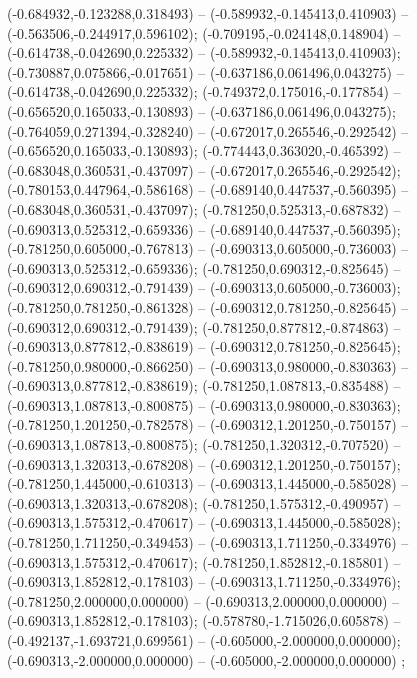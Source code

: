 (-0.684932,-0.123288,0.318493) -- (-0.589932,-0.145413,0.410903) -- (-0.563506,-0.244917,0.596102);
 (-0.709195,-0.024148,0.148904) -- (-0.614738,-0.042690,0.225332) -- (-0.589932,-0.145413,0.410903);
 (-0.730887,0.075866,-0.017651) -- (-0.637186,0.061496,0.043275) -- (-0.614738,-0.042690,0.225332);
 (-0.749372,0.175016,-0.177854) -- (-0.656520,0.165033,-0.130893) -- (-0.637186,0.061496,0.043275);
 (-0.764059,0.271394,-0.328240) -- (-0.672017,0.265546,-0.292542) -- (-0.656520,0.165033,-0.130893);
 (-0.774443,0.363020,-0.465392) -- (-0.683048,0.360531,-0.437097) -- (-0.672017,0.265546,-0.292542);
 (-0.780153,0.447964,-0.586168) -- (-0.689140,0.447537,-0.560395) -- (-0.683048,0.360531,-0.437097);
 (-0.781250,0.525313,-0.687832) -- (-0.690313,0.525312,-0.659336) -- (-0.689140,0.447537,-0.560395);
 (-0.781250,0.605000,-0.767813) -- (-0.690313,0.605000,-0.736003) -- (-0.690313,0.525312,-0.659336);
 (-0.781250,0.690312,-0.825645) -- (-0.690312,0.690312,-0.791439) -- (-0.690313,0.605000,-0.736003);
 (-0.781250,0.781250,-0.861328) -- (-0.690312,0.781250,-0.825645) -- (-0.690312,0.690312,-0.791439);
 (-0.781250,0.877812,-0.874863) -- (-0.690313,0.877812,-0.838619) -- (-0.690312,0.781250,-0.825645);
 (-0.781250,0.980000,-0.866250) -- (-0.690313,0.980000,-0.830363) -- (-0.690313,0.877812,-0.838619);
 (-0.781250,1.087813,-0.835488) -- (-0.690313,1.087813,-0.800875) -- (-0.690313,0.980000,-0.830363);
 (-0.781250,1.201250,-0.782578) -- (-0.690312,1.201250,-0.750157) -- (-0.690313,1.087813,-0.800875);
 (-0.781250,1.320312,-0.707520) -- (-0.690313,1.320313,-0.678208) -- (-0.690312,1.201250,-0.750157);
 (-0.781250,1.445000,-0.610313) -- (-0.690313,1.445000,-0.585028) -- (-0.690313,1.320313,-0.678208);
 (-0.781250,1.575312,-0.490957) -- (-0.690313,1.575312,-0.470617) -- (-0.690313,1.445000,-0.585028);
 (-0.781250,1.711250,-0.349453) -- (-0.690313,1.711250,-0.334976) -- (-0.690313,1.575312,-0.470617);
 (-0.781250,1.852812,-0.185801) -- (-0.690313,1.852812,-0.178103) -- (-0.690313,1.711250,-0.334976);
 (-0.781250,2.000000,0.000000) -- (-0.690313,2.000000,0.000000) -- (-0.690313,1.852812,-0.178103);
 (-0.578780,-1.715026,0.605878) -- (-0.492137,-1.693721,0.699561) -- (-0.605000,-2.000000,0.000000);
 (-0.690313,-2.000000,0.000000) -- (-0.605000,-2.000000,0.000000) ;
